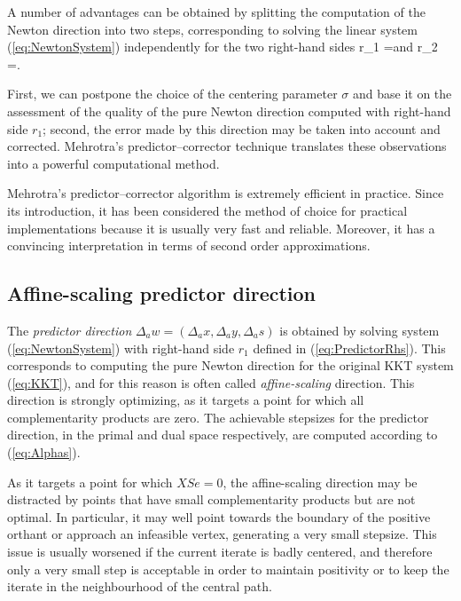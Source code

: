 A number of advantages can be obtained by splitting the computation 
of the Newton direction into two steps, corresponding to solving the linear
system (\ref{eq:NewtonSystem}) independently for the two right-hand 
sides 
\be \label{eq:PredictorRhs}
r_1 = \quad \mbox{and} \quad
r_2 =.
\ee

First, we can postpone the choice of the centering parameter 
$\sigma$ and base it on the assessment of the quality of the 
pure Newton direction computed with right-hand side $r_1$;
second, the error made by this direction may be 
taken into account and
corrected. Mehrotra's predictor--corrector technique \cite{Mehrotra92}
translates these observations into a powerful computational method.

Mehrotra's predictor--corrector algorithm \cite{Mehrotra92,LustigMarstenShanno}
is extremely efficient in practice. Since its introduction, it has 
been considered the method of choice for practical implementations 
because it is usually very fast and reliable. Moreover, it has a 
convincing interpretation in terms of second order approximations.

%
%
\subsection{Affine-scaling predictor direction}

The {\em predictor direction} 
$\Delta_a w = (\Delta_a x, \Delta_a y, \Delta_a s)$ is obtained by solving 
system (\ref{eq:NewtonSystem}) with right-hand side $r_1$ defined 
in (\ref{eq:PredictorRhs}).
This corresponds to computing the pure Newton direction for the
original KKT system (\ref{eq:KKT}), and for this reason is often
called {\em affine-scaling} direction. This 
direction is strongly optimizing, as it targets a point for which 
all complementarity products are zero. 
The achievable stepsizes for the predictor direction, 
in the primal and dual space respectively, are computed 
according to (\ref{eq:Alphas}).

As it targets a point for which $XSe = 0$, the affine-scaling direction 
may be distracted by points that have small complementarity products 
but are not optimal. 
In particular, it may well point towards the boundary of the 
positive orthant or approach an infeasible vertex, generating 
a very small stepsize. 
This issue is usually worsened if the current iterate is badly centered, 
and therefore only a very small step is acceptable in order to 
maintain positivity or to keep the iterate in the neighbourhood 
of the central path.

